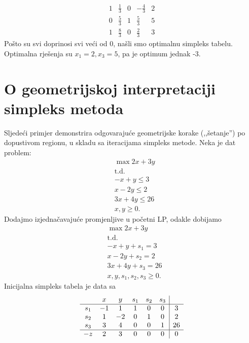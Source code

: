 \documentclass[b5paper, utf8, 11pt, colorlinks]{book}
\theoremstyle{definition}
\begin{document}
$$ \begin{array}{cccc|c}
	1   & \frac{1}{3}       & 0             &   -\frac{4}{3}             &   2  \\
	0   & \frac{5}{3}       & 1	           & \frac{5}{3}                 &   5 \\ \hline
	1   & \frac{8}{3}       & 0             &  \frac{2}{3}               &   3  
\end{array}
$$
Pošto su svi doprinosi svi veći od 0,  našli smo optimalnu simpleks tabelu.  Optimalna rješenja su 
$x_1=2, x_3=5$, pa je  optimum jednak -3.

\section{O geometrijskoj interpretaciji simpleks metoda}

Sljedeći primjer demonstrira odgovarajuće geometrijske korake (,,šetanje'') po dopustivom regionu, u skladu sa iteracijama simpleks metode.   %
Neka je dat problem:
\begin{align*}
	&\max 2x + 3y \\
	&  {\mbox{t.d.}} \\
	& -x + y \leq 3 \\
	& x - 2y \leq 2 \\
	& 3x + 4y \leq 26 \\
	& x, y \geq 0.
\end{align*}
Dodajmo izjednačavajuće promjenljive u početni LP, odakle dobijamo 
\begin{align*}
	&\max 2x + 3y \\
	& \mbox{t.d.} \\
	& -x + y + s_1 = 3 \\
	& x - 2y + s_2 = 2 \\
	& 3x + 4y + s_3 =  26 \\
	& x, y, s_1, s_2, s_3 \geq 0.
\end{align*}
Inicijalna simpleks 
tabela je data sa
$$\begin{array}{cccccc| c}
	& x & y & s_1 & s_2 & s_3 & \\ \hline
	s_1  & -1 & 1 & 1 & 0 & 0 & 3 \\
	s_2  & 1 & -2 & 0 & 1 & 0 & 2 \\
	s_3  & 3 & 4 & 0 & 0 & 1 & 26 \\ \hline
	-z  & 2 & 3 & 0 & 0 & 0 & 0 \\
\end{array}
$$  
 
\end{document}
